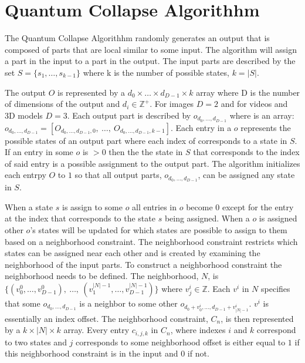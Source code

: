 \documentclass{article}
\begin{document}
\section{Quantum Collapse Algorithhm}
The Quantum Collapse Algorithhm randomly generates an output that is composed of parts that are local similar to some input.
The algorithm will assign a part in the input to a part in the output. The input parts are described by the set $S = \{s_1, \dots, s_{k-1}\}$ where k is the number
of possible states, $k = |S|$.

The output $O$ is represented by a $d_0 \times \dots \times d_{D-1} \times k$ array where D is the number of dimensions of the output and $d_i \in \mathbb{Z}^+$. 
For images $D=2$ and for videos and 3D models $D=3$. Each output part is described by $o_{d_0, \dots, d_{D-1}}$ where is an array:
$o_{d_0, \dots, d_{D-1}} = [O_{d_0, \dots, d_{D-1}, 0}, \ \dots, \ O_{d_0, \dots, d_{D-1}, k-1}]$. Each entry in a $o$ represents the possible states of an output part
where each index of corresponds to a state in $S$. If an entry in some $o$ is $> 0$ then the the state in $S$ that corresponds to the index of said entry is a possible
assignment to the output part. The algorithm initializes each entrpy $O$ to $1$ so that all output parts, $o_{d_0, \dots, d_{D-1}}$, can be assigned any state in $S$. 

When a state $s$ is assign to some $o$ all entries in $o$ become $0$ except for the entry at the index that corresponds to the state $s$ being assigned. When a $o$ is
assigned other $o$'s states will be updated for which states are possible to assign to them based on a neighborhood constraint. The neighborhood constraint restricts which states
can be assigned near each other and is created by examining the neighborhood of the input parts. To construct a neighborhood constraint the neighborhood needs to be defined.
The neighborhood, $N$, is $\{ (v_0^0, \dots, v_{D-1}^0), \ \dots, \  (v_1^{|N|-1}, \dots, v_{D-1}^{|N|-1}) \}$ where $v_j^i \in \mathbb{Z}$. Each $v^i$ in $N$ specifies
that some $o_{d_0, \dots, d_{D-1}}$ is a neighbor to some other $o_{d_0 + v^i_0, \dots, d_{D-1} + v^i_{|N| - 1}}$. $v^i$ is essentially an index offset.
The neighborhood constraint, $C_n$, is then represented by a $k \times |N| \times k$ array. Every entry $c_{i,j,k}$ in $C_n$, where indexes $i$ and $k$
correspond to two states and $j$ corresponds to some neighborhood offset is either equal to $1$ if this neighborhood constraint is in the input and $0$ if not.
\end{document}
